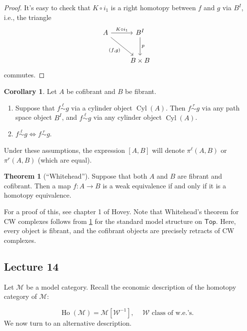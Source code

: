\documentclass[10pt,letterpaper,cm]{nupset}
\theoremstyle{definition}
\theoremstyle{theorem}
\newtheorem{theorem}[defn]{Theorem}
\newtheorem{corollary}[defn]{Corollary}
\theoremstyle{remark}
\newcommand{\1}{\mathbb{1}}
\newcommand{\m}{\mathcal{M}}
\newcommand{\w}{\mathscr{W}}
\newcommand{\0}{\vec 0}
\DeclareMathOperator{\ho}{Ho}
\DeclareMathOperator{\cyl}{Cyl}
\newcommand{\be}{\begin{enumerate}}
\newcommand{\ee}{\end{enumerate}}
\begin{document}
\begin{proof}
\medskip

It's easy to check that $K\circ i_1$ is a right homotopy between $f$ and $g$ via $B^I$, i.e., the triangle
\[
\begin{tikzcd}[row sep=large]
	A & {B^I} \\
	& {B\times B}
	\arrow["{K\circ i_1}", from=1-1, to=1-2]
	\arrow["p", from=1-2, to=2-2]
	\arrow["{\left(f,g\right)}"', from=1-1, to=2-2]
\end{tikzcd}
\] commutes. 

\end{proof}

\begin{corollary}
Let $A$ be cofibrant and $B$ be fibrant. 
\be[label=(\arabic*)]
\item Suppose that $f \overset{\ell}{\sim} g$ via a cylinder object $\cyl(A)$. Then $f \overset{r}{\sim} g$ via any path space object $B^I$, and $f \overset{\ell}{\sim} g$ via any cylinder object $\cyl(A)$.  
\item $f \overset{\ell}{\sim} g \iff f \overset{r}{\sim} g$. 
\ee
\end{corollary}

Under these assumptions, the expression $\left[A,B\right]$ will denote $\pi^{\ell}(A,B)$ or $\pi^r(A,B)$ (which are equal).

\begin{theorem}[``Whitehead'']\label{qWhite}
Suppose that both $A$ and $B$ are fibrant and cofibrant. Then a map $f: A \to B$ is a weak equivalence if and only if it is a homotopy equivalence. 
\end{theorem}

For a proof of this, see chapter 1 of Hovey. Note that Whitehead's theorem for CW complexes follows from \cref{qWhite} for the standard model structure on $\mathsf{Top}$. Here, every object is fibrant, and the cofibrant objects are precisely retracts of CW complexes. 

\subsection{Lecture 14}

Let $\m$ be a model category. Recall the economic description of the homotopy category of $\m$:

\[
\ho(\m) = \m\left[\w^{-1}\right], \ \quad \text{$\w$ class of w.e.'s}
.\] We now turn to an alternative description.

\medskip
\end{document}
